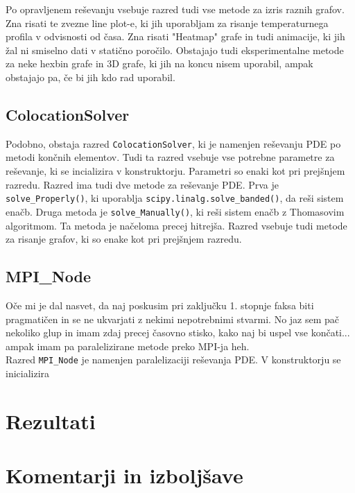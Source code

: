 \documentclass[a4paper]{article}
\begin{document}
Po opravljenem reševanju vsebuje razred tudi vse metode za izris raznih grafov. Zna risati te 
zvezne line plot-e, ki jih uporabljam za risanje temperaturnega profila v odvisnosti od časa. Zna
risati "Heatmap" grafe in tudi animacije, ki jih žal ni smiselno dati v statično poročilo. Obstajajo
tudi eksperimentalne metode za neke hexbin grafe in 3D grafe, ki jih na koncu nisem uporabil, ampak
obstajajo pa, če bi jih kdo rad uporabil.\\

\subsection{ColocationSolver}
Podobno, obstaja razred \texttt{ColocationSolver}, ki je namenjen reševanju PDE po metodi končnih
elementov. Tudi ta razred vsebuje vse potrebne parametre za reševanje, ki se incializira v 
konstruktorju. Parametri so enaki kot pri prejšnjem razredu. Razred ima tudi dve metode za
reševanje PDE. Prva je \texttt{solve\_Properly()}, ki uporablja \texttt{scipy.linalg.solve\_banded()},
da reši sistem enačb. Druga metoda je \texttt{solve\_Manually()}, ki reši sistem enačb z Thomasovim
algoritmom. Ta metoda je načeloma precej hitrejša. Razred vsebuje tudi metode za risanje grafov, ki so
enake kot pri prejšnjem razredu.\\


\subsection{MPI_Node}
Oče mi je dal nasvet, da naj poskusim pri zaključku 1. stopnje faksa biti pragmatičen in se ne ukvarjati
z nekimi nepotrebnimi stvarmi. No jaz sem pač nekoliko glup in imam zdaj precej časovno stisko, kako
naj bi uspel vse končati... ampak imam pa paralelizirane metode preko MPI-ja heh.\\

Razred \texttt{MPI\_Node} je namenjen paralelizaciji reševanja PDE. V konstruktorju se inicializira



\section{Rezultati}


\section{Komentarji in izboljšave}

\newpage


\end{document}
